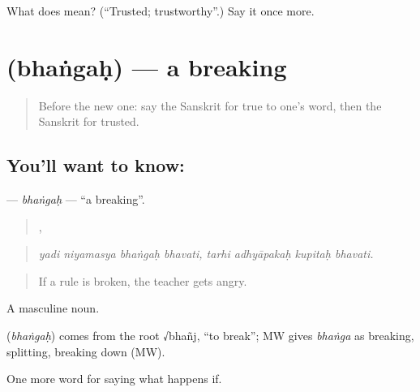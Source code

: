 \begin{tcolorbox}[breakable,colback=teal!4,colframe=teal!35!black,title={Before you move on}]
What does  mean? (\textquotedblleft{}Trusted; trustworthy\textquotedblright{}.) Say it once more.
\end{tcolorbox}
\section[\texorpdfstring{\sk{भंगः} (bhaṅgaḥ)}{भंगः (bhaṅgaḥ)}]{ (bhaṅgaḥ) — a breaking}

\label{lesson:SA-C535-bhangah}



\begin{quote}
Before the new one: say the Sanskrit for true to one's word, then the Sanskrit for trusted.
\end{quote}

\subsection*{You'll want to know: }
\textbf{} — \emph{bhaṅgaḥ} — \textquotedblleft{}a breaking\textquotedblright{}.

\begin{quote}
   ,    
\end{quote}

\begin{quote}
\emph{yadi niyamasya bhaṅgaḥ bhavati, tarhi adhyāpakaḥ kupitaḥ bhavati.}
\end{quote}

\begin{quote}
If a rule is broken, the teacher gets angry.
\end{quote}

A masculine noun.

\begin{cousinweb}
\textbf{} (\emph{bhaṅgaḥ}) comes from the root √bhañj, \textquotedblleft{}to break\textquotedblright{}; MW gives \emph{bhaṅga} as breaking, splitting, breaking down (MW).
\end{cousinweb}

\begin{grammarlens}[title={What you've built}]
One more word for saying what happens if.
\end{grammarlens}


